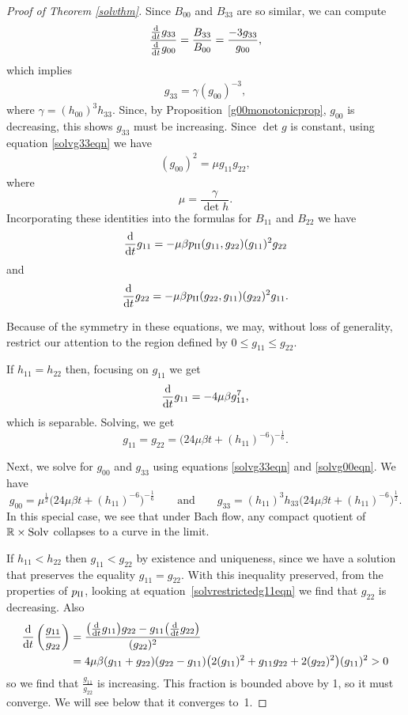 \documentclass[10pt,a4paper]{amsart}
\numberwithin{equation}{section}
\newcommand{\dtime}{\frac{{\rm d}}{{\rm d} t}} %
\begin{document}
\begin{proof}[Proof of Theorem \ref{solvthm}]
Since $B_{00}$ and $B_{33}$ are so similar, we can compute
\begin{equation*}
\frac{\dtime g_{33}}{\dtime g_{00}} = \frac{B_{33}}{B_{00}}
			= \frac{-3 g_{33}}{g_{00}},
\end{equation*}
which implies
\begin{gather} \label{solvg33eqn}
g_{33} = \gamma (g_{00})^{-3},
\end{gather}
where $\gamma = (h_{00})^3 h_{33}$. Since, by Proposition~\ref{g00monotonicprop}, $g_{00}$ is decreasing, this shows $g_{33}$ must be increasing. Since $\det g$ is constant, using equation \eqref{solvg33eqn} we have
\begin{gather} \label{solvg00eqn}
(g_{00})^2 = \mu g_{11} g_{22},
\end{gather}
where
\[
\mu = \frac{\gamma}{\det h}.
\]
Incorporating these identities into the formulas for $B_{11}$ and $B_{22}$ we have
\begin{gather} \label{solvrestrictedg11eqn}
\dtime g_{11} = -\mu \beta p_{\rm II}(g_{11}, g_{22}) (g_{11})^2 g_{22}
\end{gather}
and
\[
\dtime g_{22} = -\mu \beta p_{\rm II}(g_{22}, g_{11}) (g_{22})^2 g_{11}.
\]

Because of the symmetry in these equations, we may, without loss of generality, restrict our attention to the region defined by $0 \leq g_{11} \leq g_{22}$.

If $h_{11} = h_{22}$ then, focusing on $g_{11}$ we get
\[
\dtime g_{11} = -4\mu \beta g_{11}^7,
\]
which is separable. Solving, we get
\[
g_{11} = g_{22} = \big(24 \mu \beta t + (h_{11})^{-6} \big)^{-\frac{1}{6}}.
\]

Next, we solve for $g_{00}$ and $g_{33}$ using equations \eqref{solvg33eqn} and \eqref{solvg00eqn}. We have
\[
g_{00} = \mu^{\frac{1}{2}} \bigl(24 \mu \beta t + (h_{11})^{-6} \bigr)^{-\frac{1}{6}}
\qquad \text{and} \qquad
g_{33} = (h_{11})^3 h_{33} \bigl(24 \mu \beta t + (h_{11})^{-6} \bigr)^{\frac{1}{2}}.
\]
In this special case, we see that under Bach flow, any compact quotient of $\mathbb{R} \times {\rm Solv}$ collapses to a curve in the limit.

If $h_{11} < h_{22}$ then $g_{11} < g_{22}$ by existence and uniqueness, since we have a solution that preserves the equality $g_{11} = g_{22}$. With this inequality preserved, from the properties of $p_{\rm II}$, looking at equation~\eqref{solvrestrictedg11eqn} we find that $g_{22}$ is decreasing. Also
\begin{align*}
\dtime \left(\frac{g_{11}}{g_{22}} \right)
	&= \frac{\big(\dtime g_{11} \big) g_{22} - g_{11} \big(\dtime g_{22} \big)}{(g_{22})^2} \\
	&= 4 \mu \beta (g_{11} + g_{22})(g_{22} - g_{11})
					\big(2(g_{11})^2 + g_{11} g_{22} + 2 (g_{22})^2 \big) (g_{11})^2 > 0
\end{align*}
so we find that $\frac{g_{11}}{g_{22}}$ is increasing. This fraction is bounded above by 1, so it must converge. We will see below that it converges to~1.


\end{proof}
\end{document}
